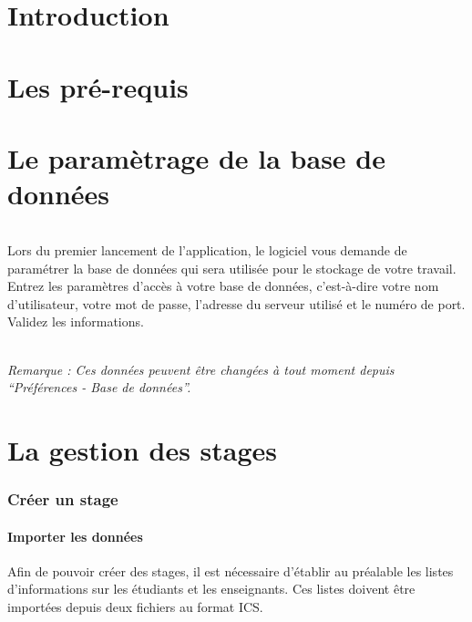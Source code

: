 \documentclass[a4paper,10pt]{book}
\begin{document}
\strut
\renewcommand{\contentsname}{Sommaire}
\tableofcontents

\part{Introduction}

\part{Les pré-requis}

\part{Le paramètrage de la base de données}
  \paragraph{}
    Lors du premier lancement de l'application, le logiciel vous demande de paramétrer la base de données qui sera utilisée pour le stockage de votre travail.
    Entrez les paramètres d'accès à votre base de données, c'est-à-dire votre nom d'utilisateur, votre mot de passe, l'adresse du serveur utilisé et le numéro de port.
    Validez les informations.
    
    \paragraph{}
      \textit{Remarque : Ces données peuvent être changées à tout moment depuis ``Préférences - Base de données''.}
  
  
\part{La gestion des stages}
    \section{Créer un stage} 
      
      \subsection{Importer les données}
      
	Afin de pouvoir créer des stages, il est nécessaire d'établir au préalable les listes d'informations sur les étudiants et les enseignants.
	Ces listes doivent être importées depuis deux fichiers au format ICS.
	
\end{document}
